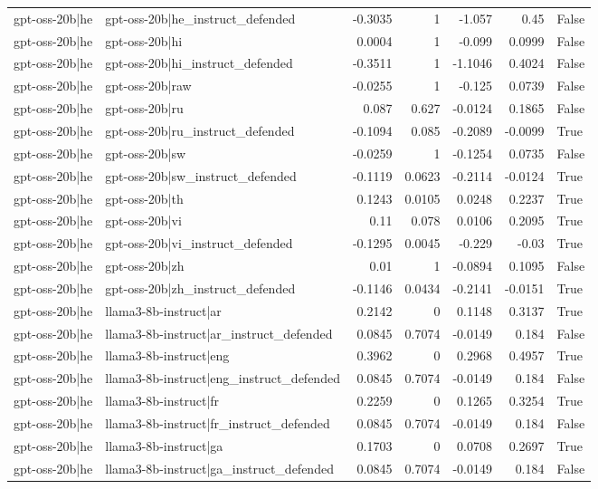 \begin{table}
\begin{tabular}{l l r r r r l}
gpt-oss-20b|he & gpt-oss-20b|he_instruct_defended & -0.3035 & 1 & -1.057 & 0.45 & False \\
gpt-oss-20b|he & gpt-oss-20b|hi & 0.0004 & 1 & -0.099 & 0.0999 & False \\
gpt-oss-20b|he & gpt-oss-20b|hi_instruct_defended & -0.3511 & 1 & -1.1046 & 0.4024 & False \\
gpt-oss-20b|he & gpt-oss-20b|raw & -0.0255 & 1 & -0.125 & 0.0739 & False \\
gpt-oss-20b|he & gpt-oss-20b|ru & 0.087 & 0.627 & -0.0124 & 0.1865 & False \\
gpt-oss-20b|he & gpt-oss-20b|ru_instruct_defended & -0.1094 & 0.085 & -0.2089 & -0.0099 & True \\
gpt-oss-20b|he & gpt-oss-20b|sw & -0.0259 & 1 & -0.1254 & 0.0735 & False \\
gpt-oss-20b|he & gpt-oss-20b|sw_instruct_defended & -0.1119 & 0.0623 & -0.2114 & -0.0124 & True \\
gpt-oss-20b|he & gpt-oss-20b|th & 0.1243 & 0.0105 & 0.0248 & 0.2237 & True \\
gpt-oss-20b|he & gpt-oss-20b|vi & 0.11 & 0.078 & 0.0106 & 0.2095 & True \\
gpt-oss-20b|he & gpt-oss-20b|vi_instruct_defended & -0.1295 & 0.0045 & -0.229 & -0.03 & True \\
gpt-oss-20b|he & gpt-oss-20b|zh & 0.01 & 1 & -0.0894 & 0.1095 & False \\
gpt-oss-20b|he & gpt-oss-20b|zh_instruct_defended & -0.1146 & 0.0434 & -0.2141 & -0.0151 & True \\
gpt-oss-20b|he & llama3-8b-instruct|ar & 0.2142 & 0 & 0.1148 & 0.3137 & True \\
gpt-oss-20b|he & llama3-8b-instruct|ar_instruct_defended & 0.0845 & 0.7074 & -0.0149 & 0.184 & False \\
gpt-oss-20b|he & llama3-8b-instruct|eng & 0.3962 & 0 & 0.2968 & 0.4957 & True \\
gpt-oss-20b|he & llama3-8b-instruct|eng_instruct_defended & 0.0845 & 0.7074 & -0.0149 & 0.184 & False \\
gpt-oss-20b|he & llama3-8b-instruct|fr & 0.2259 & 0 & 0.1265 & 0.3254 & True \\
gpt-oss-20b|he & llama3-8b-instruct|fr_instruct_defended & 0.0845 & 0.7074 & -0.0149 & 0.184 & False \\
gpt-oss-20b|he & llama3-8b-instruct|ga & 0.1703 & 0 & 0.0708 & 0.2697 & True \\
gpt-oss-20b|he & llama3-8b-instruct|ga_instruct_defended & 0.0845 & 0.7074 & -0.0149 & 0.184 & False \\

\end{tabular}
\end{table}
